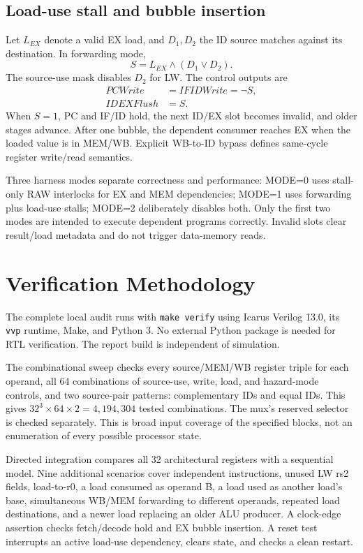 \documentclass[conference]{IEEEtran}
\begin{document}
\subsection{Load-use stall and bubble insertion}
Let $L_{EX}$ denote a valid EX load, and $D_1,D_2$ the ID source matches against its destination. In forwarding mode,
\begin{equation}
S=L_{EX}\land(D_1\lor D_2).
\end{equation}
The source-use mask disables $D_2$ for LW. The control outputs are
\begin{equation}
\begin{aligned}
PCWrite &= IFIDWrite = \neg S,\\
IDEXFlush &= S.
\end{aligned}
\end{equation}
When $S=1$, PC and IF/ID hold, the next ID/EX slot becomes invalid, and older stages advance. After one bubble, the dependent consumer reaches EX when the loaded value is in MEM/WB. Explicit WB-to-ID bypass defines same-cycle register write/read semantics.

Three harness modes separate correctness and performance: MODE=0 uses stall-only RAW interlocks for EX and MEM dependencies; MODE=1 uses forwarding plus load-use stalls; MODE=2 deliberately disables both. Only the first two modes are intended to execute dependent programs correctly. Invalid slots clear result/load metadata and do not trigger data-memory reads.

\section{Verification Methodology}
The complete local audit runs with \texttt{make verify} using Icarus Verilog 13.0, its \texttt{vvp} runtime, Make, and Python 3. No external Python package is needed for RTL verification. The report build is independent of simulation.

The combinational sweep checks every source/MEM/WB register triple for each operand, all 64 combinations of source-use, write, load, and hazard-mode controls, and two source-pair patterns: complementary IDs and equal IDs. This gives $32^3\times64\times2=4{,}194{,}304$ tested combinations. The mux's reserved selector is checked separately. This is broad input coverage of the specified blocks, not an enumeration of every possible processor state.

Directed integration compares all 32 architectural registers with a sequential model. Nine additional scenarios cover independent instructions, unused LW rs2 fields, load-to-r0, a load consumed as operand B, a load used as another load's base, simultaneous WB/MEM forwarding to different operands, repeated load destinations, and a newer load replacing an older ALU producer. A clock-edge assertion checks fetch/decode hold and EX bubble insertion. A reset test interrupts an active load-use dependency, clears state, and checks a clean restart.
\end{document}
